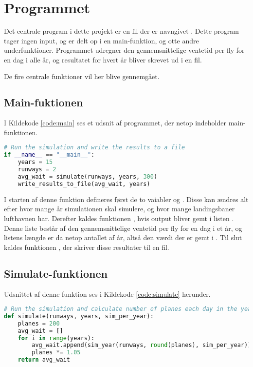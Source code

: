\chapter{Programmet} \label{chap:program}
Det centrale program i dette projekt er en fil der er navngivet .
Dette program tager ingen input, og er delt op i en main-funktion, og otte andre underfunktioner.
Programmet udregner den gennemsnittelige ventetid per fly for en dag i alle år, og resultatet for hvert år bliver skrevet ud i en fil.

De fire centrale funktioner vil her blive gennemgået.

\section{Main-fuktionen}
I Kildekode \ref{code:main} ses et udsnit af programmet, der netop indeholder main-funktionen.

\begin{lstlisting}[language=Python, caption={Main-funktionen i airplanes.py}, label=code:main]
# Run the simulation and write the results to a file
if __name__ == "__main__":
    years = 15
    runways = 2
    avg_wait = simulate(runways, years, 300)
    write_results_to_file(avg_wait, years)
\end{lstlisting}

I starten af denne funktion defineres først de to vaiabler  og . Disse kan ændres alt efter hvor mange år simulationen skal simulere, og hvor mange landingsbaner lufthavnen har.
Derefter kaldes funktionen , hvis output bliver gemt i listen .
Denne liste består af den gennemsnittelige ventetid per fly for en dag i et år, og listens længde er da netop antallet af år, altså den værdi der er gemt i .
Til slut kaldes funktionen , der skriver disse resultater til en fil.

\section{Simulate-funktionen}
Udsnittet af denne funktion ses i Kildekode \ref{code:simulate} herunder.

\begin{lstlisting}[language=Python, caption={simulate-funktionen i airplanes.py}, label=code:simulate]
# Run the simulation and calculate number of planes each day in the year
def simulate(runways, years, sim_per_year):
    planes = 200
    avg_wait = []
    for i in range(years):
        avg_wait.append(sim_year(runways, round(planes), sim_per_year))
        planes *= 1.05
    return avg_wait
\end{lstlisting}

